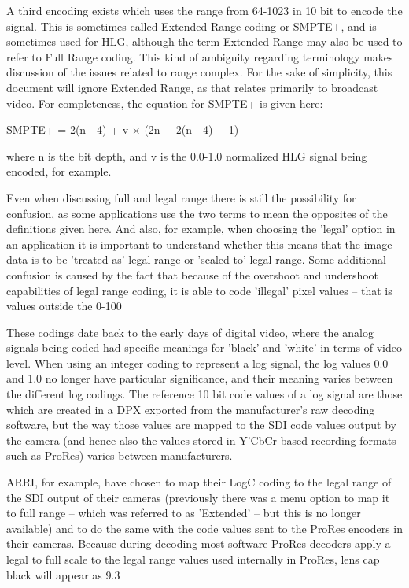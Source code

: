 A third encoding exists which uses the range from 64-1023 in 10 bit to encode the signal. This is sometimes called Extended Range coding or SMPTE+, and is sometimes used for HLG, although the term Extended Range may also be used to refer to Full Range coding. This kind of ambiguity regarding terminology makes discussion of the issues related to range complex. For the sake of simplicity, this document will ignore Extended Range, as that relates primarily to broadcast video. For completeness, the equation for SMPTE+ is given here:

	SMPTE+ = 2(n - 4) +  v × (2n − 2(n - 4) − 1)

where n is the bit depth, and v is the 0.0-1.0 normalized HLG signal being encoded, for example.

Even when discussing full and legal range there is still the possibility for confusion, as some applications use the two terms to mean the opposites of the definitions given here. And also, for example, when choosing the 'legal' option in an application it is important to understand whether this means that the image data is to be 'treated as' legal range or 'scaled to' legal range. Some additional confusion is caused by the fact that because of the overshoot and undershoot capabilities of legal range coding, it is able to code 'illegal' pixel values – that is values outside the 0-100%

These codings date back to the early days of digital video, where the analog signals being coded had specific meanings for 'black' and 'white' in terms of video level. When using an integer coding to represent a log signal, the log values 0.0 and 1.0 no longer have particular significance, and their meaning varies between the different log codings. The reference 10 bit code values of a log signal are those which are created in a DPX exported from the manufacturer’s raw decoding software, but the way those values are mapped to the SDI code values output by the camera (and hence also the values stored in Y’CbCr based recording formats such as ProRes) varies between manufacturers.

ARRI, for example, have chosen to map their LogC coding to the legal range of the SDI output of their cameras (previously there was a menu option to map it to full range – which was referred to as 'Extended' – but this is no longer available) and to do the same with the code values sent to the ProRes encoders in their cameras. Because during decoding most software ProRes decoders apply a legal to full scale to the legal range values used internally in ProRes, lens cap black will appear as 9.3%



